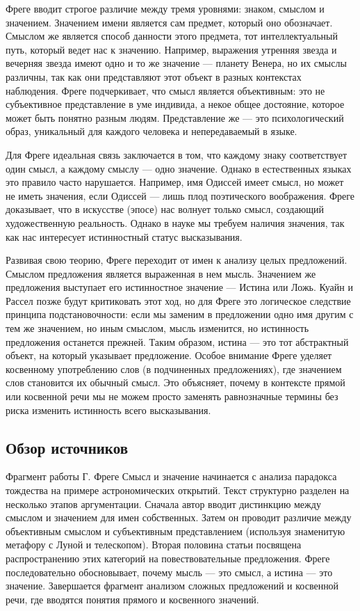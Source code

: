 \documentclass[a4paper,12pt]{article}
\begin{document}
Фреге вводит строгое различие между тремя уровнями: знаком, смыслом и значением. Значением имени является сам предмет, который оно обозначает. Смыслом же является способ данности этого предмета, тот интеллектуальный путь, который ведет нас к значению. Например, выражения утренняя звезда и вечерняя звезда имеют одно и то же значение — планету Венера, но их смыслы различны, так как они представляют этот объект в разных контекстах наблюдения. Фреге подчеркивает, что смысл является объективным: это не субъективное представление в уме индивида, а некое общее достояние, которое может быть понятно разным людям. Представление же — это психологический образ, уникальный для каждого человека и непередаваемый в языке.

Для Фреге идеальная связь заключается в том, что каждому знаку соответствует один смысл, а каждому смыслу — одно значение. Однако в естественных языках это правило часто нарушается. Например, имя Одиссей имеет смысл, но может не иметь значения, если Одиссей — лишь плод поэтического воображения. Фреге доказывает, что в искусстве (эпосе) нас волнует только смысл, создающий художественную реальность. Однако в науке мы требуем наличия значения, так как нас интересует истинностный статус высказывания.

Развивая свою теорию, Фреге переходит от имен к анализу целых предложений. Смыслом предложения является выраженная в нем мысль. Значением же предложения выступает его истинностное значение — Истина или Ложь. Куайн и Рассел позже будут критиковать этот ход, но для Фреге это логическое следствие принципа подстановочности: если мы заменим в предложении одно имя другим с тем же значением, но иным смыслом, мысль изменится, но истинность предложения останется прежней. Таким образом, истина — это тот абстрактный объект, на который указывает предложение. Особое внимание Фреге уделяет косвенному употреблению слов (в подчиненных предложениях), где значением слов становится их обычный смысл. Это объясняет, почему в контексте прямой или косвенной речи мы не можем просто заменять равнозначные термины без риска изменить истинность всего высказывания.

\subsection{Обзор источников}

Фрагмент работы Г. Фреге Смысл и значение начинается с анализа парадокса тождества на примере астрономических открытий. Текст структурно разделен на несколько этапов аргументации. Сначала автор вводит дистинкцию между смыслом и значением для имен собственных. Затем он проводит различие между объективным смыслом и субъективным представлением (используя знаменитую метафору с Луной и телескопом). Вторая половина статьи посвящена распространению этих категорий на повествовательные предложения. Фреге последовательно обосновывает, почему мысль — это смысл, а истина — это значение. Завершается фрагмент анализом сложных предложений и косвенной речи, где вводятся понятия прямого и косвенного значений.
\end{document}
